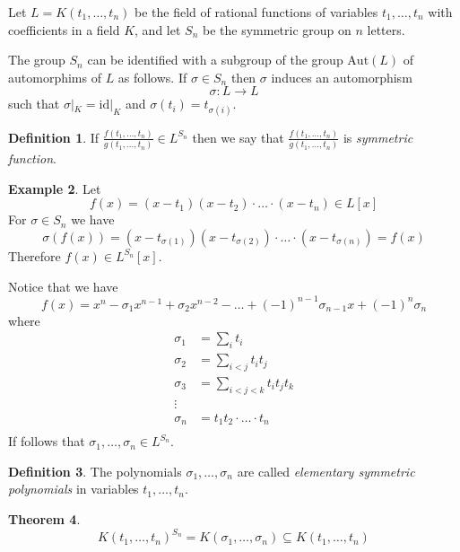 \documentclass[12pt, letterpaper, oneside]{article}
\theoremstyle{plain}
\newtheorem{theorem}{Theorem}[section]
\theoremstyle{definition}
\newtheorem{definition}[theorem]{Definition}
\newtheorem{example}[theorem]{Example}
\newcommand{\lra}{\longrightarrow}
\newcommand{\Aut}{\mathrm{Aut}}
\newcommand{\id}{\mathrm{id}}
\newcommand{\vs}{\vskip 5mm}
\begin{document}
Let $L = K(t_{1}, \dots, t_{n})$ be the field of rational functions of variables $t_{1}, \dots, t_{n}$
with coefficients in a field $K$, and let $S_{n}$ be the symmetric group on $n$ letters. 

The group $S_{n}$ can be identified with a subgroup of the group $\Aut(L)$
of automorphims of $L$ as follows. If $\sigma\in S_{n}$ then $\sigma$ induces
an automorphism 
$$\sigma \colon L \lra L$$
such that $\sigma|_{K} = \id|_{K}$ and $\sigma(t_{i}) = t_{\sigma(i)}$. 

\vs

\begin{definition}
If $\frac{f(t_{1}, \dots, t_{n})}{g(t_{1}, \dots, t_{n})}\in L^{S_{n}}$ then we say that 
$\frac{f(t_{1}, \dots, t_{n})}{g(t_{1}, \dots, t_{n})}$ is \emph{symmetric function}.
\end{definition}


\vs


\begin{example}
Let 
$$f(x) = (x-t_{1})(x-t_{2})\cdot \dots \cdot (x-t_{n}) \in L[x]$$
For $\sigma \in S_{n}$ we have 
$$\sigma(f(x)) = (x-t_{\sigma(1)})(x-t_{\sigma(2)})\cdot \dots \cdot (x-t_{\sigma(n)}) = f(x)$$
Therefore $f(x) \in L^{S_{n}}[x]$. 

Notice that we have 
$$f(x) = x^{n} - \sigma_{1}x^{n-1} + \sigma_{2}x^{n-2} - \dots + (-1)^{n-1}\sigma_{n-1}x + (-1)^{n}\sigma_{n}$$
where
\begin{align*}
\sigma_{1} & = \sum_{i} t_{i} \\
\sigma_{2} & = \sum_{i<j} t_{i}t_{j} \\
\sigma_{3} & = \sum_{i<j<k} t_{i}t_{j}t_{k} \\
\vdots &  \\
\sigma_{n} & = t_{1}t_{2}\cdot{\dots}\cdot t_{n} \\
\end{align*}
If follows that $\sigma_{1}, \dots, \sigma_{n}\in L^{S_{n}}$.
\end{example}


\vs\vs

\begin{definition}
The polynomials $\sigma_{1}, \dots, \sigma_{n}$ are called \emph{elementary symmetric polynomials}
in variables $t_{1}, \dots, t_{n}$. 
\end{definition}

\vs\vs

\begin{theorem}
$$K(t_{1}, \dots, t_{n})^{S_{n}} = K(\sigma_{1}, \dots, \sigma_{n}) \subseteq K(t_{1}, \dots, t_{n})$$
\end{theorem}
\end{document}
